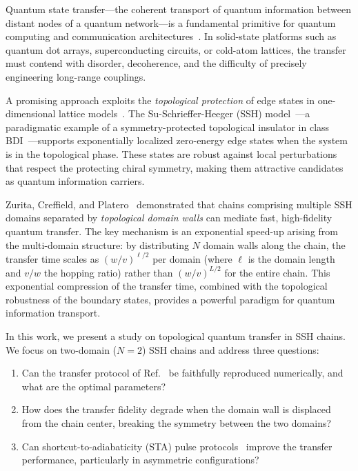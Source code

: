 \documentclass[
  reprint,
  amsmath,
  amssymb,
  aps,
  prb,
  longbibliography,
]{revtex4-2}
\begin{document}
Quantum state transfer---the coherent transport of quantum information between
distant nodes of a quantum network---is a fundamental primitive for quantum
computing and communication architectures~\cite{Bose2003, Christandl2004,
Nikolopoulos2014}. In solid-state platforms such as quantum dot arrays,
superconducting circuits, or cold-atom lattices, the transfer must contend with
disorder, decoherence, and the difficulty of precisely engineering long-range
couplings.

A promising approach exploits the \emph{topological protection} of edge states in
one-dimensional lattice models~\cite{Hasan2010, Asboth2016}. The
Su-Schrieffer-Heeger (SSH) model~\cite{SSH1979, SSH1980}---a paradigmatic
example of a symmetry-protected topological insulator in class BDI~\cite{Ryu2010}---supports
exponentially localized zero-energy edge states when the system is in the
topological phase. These states are robust against local perturbations that respect
the protecting chiral symmetry, making them attractive candidates as quantum
information carriers.

Zurita, Creffield, and Platero~\cite{Zurita2023} demonstrated that chains
comprising multiple SSH domains separated by \emph{topological domain walls}
can mediate fast, high-fidelity quantum transfer. The key mechanism is an
exponential speed-up arising from the multi-domain structure: by distributing
$N$ domain walls along the chain, the transfer time scales as
$(w/v)^{\ell/2}$ per domain (where $\ell$ is the domain length and $v/w$ the
hopping ratio) rather than $(w/v)^{L/2}$ for the entire chain. This exponential
compression of the transfer time, combined with the topological robustness of
the boundary states, provides a powerful paradigm for quantum information
transport.

In this work, we present a study on topological
quantum transfer in SSH chains. We focus on two-domain ($N = 2$) SSH chains and address three
questions:
\begin{enumerate}
  \item Can the transfer protocol of Ref.~\cite{Zurita2023} be faithfully
    reproduced numerically, and what are the optimal parameters?
  \item How does the transfer fidelity degrade when the domain wall is displaced
    from the chain center, breaking the symmetry between the two domains?
  \item Can shortcut-to-adiabaticity (STA) pulse
    protocols~\cite{Demirplak2003, Berry2009, GueryOdelin2019} improve the
    transfer performance, particularly in asymmetric configurations?
\end{enumerate}
\end{document}
